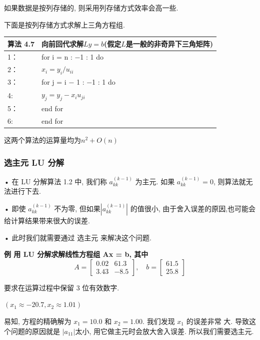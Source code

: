 \documentclass[12pt,a4paper]{article}
\begin{document}
如果数据是按列存储的, 则采用列存储方式效率会高一些.

下面是按列存储方式求解上三角方程组.

\begin{table}  
	\begin{tabular*}{16cm}{ll}  
		\hline  
		算法 4.7 &向前回代求解$Ly =b$(假定$L$是一般的非奇异下三角矩阵)\\  
		\hline  
		1：   & for i = n : −1 : 1 do\\  
		2：   & \qquad $x_{i}=y_{i} / u_{i i}$\\
		3：   & \qquad for j = i − 1 : −1 : 1 do\\
		4:    & \qquad \qquad$y_{j}=y_{j}-x_{i} u_{j i}$\\
		5：   & \qquad end for\\
		6:    & end for\\
		\hline  
	\end{tabular*}  
\end{table}

这两个算法的运算量均为$n^2+O(n)$

\subsubsection{选主元 LU 分解}
• 在 LU 分解算法 1.2 中, 我们称 $a_{k k}^{(k-1)}$ 为主元. 如果 $a_{k k}^{(k-1)}=0$, 则算法就无法进行下去.

• 即使 $a_{k k}^{(k-1)}$ 不为零, 但如果$\left|a_{k k}^{(k-1)}\right|$ 的值很小, 由于舍入误差的原因,也可能会给计算结果带来很大的误差.

• 此时我们就需要通过 选主元 来解决这个问题.


\bfseries{例} 用 LU 分解求解线性方程组 Ax = b, 其中
\begin{equation}
A=\left[\begin{array}{cc}{0.02} & {61.3} \\ {3.43} & {-8.5}\end{array}\right], \quad b=\left[\begin{array}{c}{61.5} \\ {25.8}\end{array}\right]
\end{equation}

要求在运算过程中保留 3 位有效数字.	

$(x_1 ≈ −20.7, x_2 ≈ 1.01)$


易知, 方程的精确解为 $x_1 = 10.0$ 和 $x_2 = 1.00$. 我们发现 $x_1$ 的误差非常
大. 导致这个问题的原因就是 $|a_{11}| $太小, 用它做主元时会放大舍入误差.
所以我们需要选主元.
\end{document}
